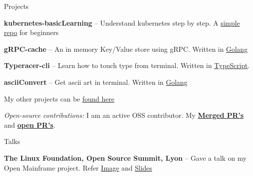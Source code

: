 \documentclass{resume} %
\begin{document}

\begin{rSection}{Projects}
  \begin{rProjectSection}
    \item \textbf {kubernetes-basicLearning} -- Understand kubernetes step by step. A \href{https://github.com/knrt10/kubernetes-basicLearning/}{simple repo} for beginners
    \item \textbf {gRPC-cache} -- An in memory Key/Value store using gRPC. Written in \href{https://github.com/knrt10/gRPC-cache}{Golang}
    \item \textbf {Typeracer-cli} -- Learn how to touch type from terminal. Written in \href{https://github.com/p-society/typeracer-cli/}{TypeScript}.
    \item \textbf {asciiConvert} -- Get ascii art in terminal. Written in \href{https://github.com/knrt10/asciiConvert/}{Golang}
    \item My other projects can be \href{https://knrt10.github.io/projects/}{found here}
  \end{rProjectSection}

  \begin{rBlurbSection}
    \item {\em Open-source contributions:}
      I am an active OSS contributor. My \href{http://bit.ly/2kdr9Ui}{\textbf{Merged PR's}} and \href{http://bit.ly/2kxjvV9}{\textbf{open PR's}}.
  \end{rBlurbSection}
\end{rSection}


\begin{rSection}{Talks}
  \begin{rProjectSection}
    \item \textbf {The Linux Foundation, Open Source Summit, Lyon} -- Gave a talk on my Open Mainframe project. Refer \href{https://user-images.githubusercontent.com/24803604/68012174-99a5a680-fc89-11e9-8c8e-800e68b8c231.jpeg}{Image} and \href{https://drive.google.com/file/d/1z2dhNwudUs8BYJRzIXL70UH7htLJasf0/view}{Slides}
  \end{rProjectSection}
\end{rSection}
\end{document}
